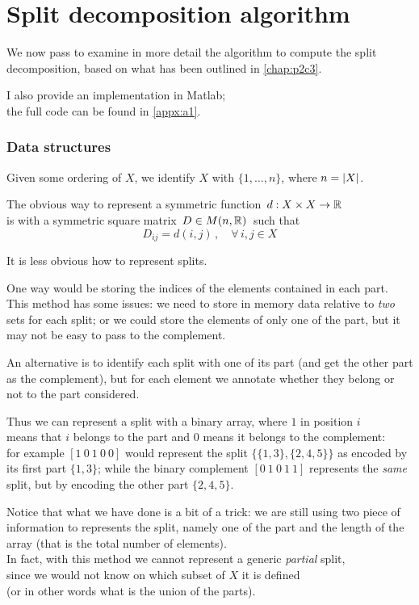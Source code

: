 \documentclass[./main.tex]{subfiles}
\begin{document}
\ifSubfilesClassLoaded{\mainmatter}{}

\chapter{Split decomposition algorithm} \label{chap:p3c2}

We now pass to examine in more detail the algorithm to compute the split decomposition, based on what has been outlined in \autoref{chap:p2c3}.

I also provide an implementation in Matlab; \\
\bsp the full code can be found in \autoref{appx:a1}.


\subsection*{Data structures}

Given some ordering of $X$, we identify $X$ with $\{ 1, \dots, n \}$, where $n = \left\lvert X\right\rvert$.

The obvious way to represent a symmetric function $\, d : {X \times X} \to \mathbb{R} \,$ \\ \bsp is with a symmetric square matrix $\, D \in M(n,\mathbb{R}) \,$ such that
\[ D_{ij} = d(i,j) \,, \quad \forall\,i,j \in X \]

It is less obvious how to represent splits.

One way would be storing the indices of the elements contained in each part. \\
This method has some issues: we need to store in memory data relative to \emph{two} sets for each split; or we could store the elements of only one of the part, but it may not be easy to pass to the complement.

An alternative is to identify each split with one of its part (and get the other part as the complement), but for each element we annotate whether they belong or not to the part considered.

Thus we can represent a split with a binary array, where $1$ in position $i$ \\
\bsp means that $i$ belongs to the part and $0$ means it belongs to the complement: \\[1pt]
for example $[1\ 0\ 1\ 0\ 0]$ would represent the split $\bigl\{ \{1,3\},\{2,4,5\} \bigr\}$ as encoded by its first part $\{1,3\}$; while the binary complement $[0\ 1\ 0\ 1\ 1]$ represents the \emph{same} split, but by encoding the other part $\{2,4,5\}$.

Notice that what we have done is a bit of a trick: we are still using two piece of information to represents the split, namely one of the part and the length of the array (that is the total number of elements). \\
In fact, with this method we cannot represent a generic \emph{partial} split, \\
since we would not know on which subset of $X$ it is defined \\
(or in other words what is the union of the parts).
\end{document}
